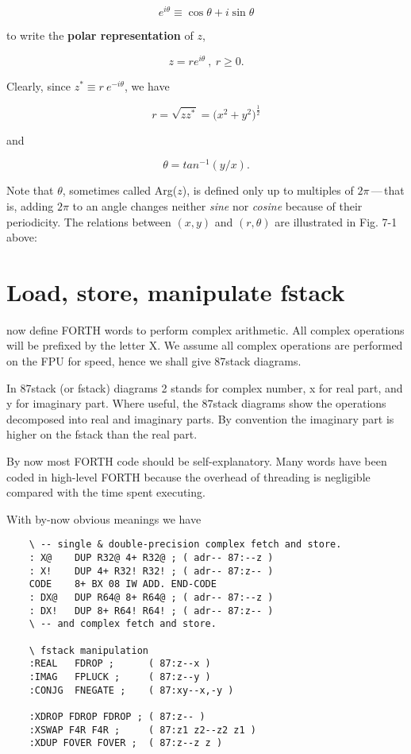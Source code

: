 \begin{equation}
  e^{i\theta} \equiv \cos \theta + i \sin \theta
\end{equation}

to write the \textbf{polar representation} of $z$,

\begin{equation}
  z = re^{i\theta}\ ,\ r \geq 0.
\end{equation}

Clearly, since $z^* \equiv r\ e^{-i\theta}$, we have

\begin{equation}
  r = \sqrt{zz^*} = \big(x^2 + y^2\big)^\frac{1}{2}
\end{equation}

and

\begin{equation}
  \theta = tan^{-1}(y/x).
\end{equation}

Note that $\theta$, sometimes called Arg($z$), is defined only up to multiples of $2\pi$\,---\,that is, adding $2\pi$ to an angle changes neither \textit{sine} nor \textit{cosine} because of their periodicity. The relations between $(x,y)$ and $(r,\theta)$ are illustrated in Fig. 7-1 above:

\section{Load, store, manipulate fstack}
 now define FORTH words to perform complex arithmetic. All complex operations will be prefixed by the letter X. We assume all complex operations are performed on the FPU for speed, hence we shall give 87stack diagrams.

In 87stack (or fstack) diagrams 2 stands for complex number, x for real part, and y for imaginary part. Where useful, the 87stack diagrams show the operations decomposed into real and imaginary parts. By convention the imaginary part is higher on the fstack than the real part.

By now most FORTH code should be self-explanatory. Many words have been coded in high-level FORTH because the overhead of threading is negligible compared with the time spent executing.

With by-now obvious meanings we have

\begin{lstlisting}
    \ -- single & double-precision complex fetch and store.
    : X@    DUP R32@ 4+ R32@ ; ( adr-- 87:--z )
    : X!    DUP 4+ R32! R32! ; ( adr-- 87:z-- )
    CODE    8+ BX 08 IW ADD. END-CODE
    : DX@   DUP R64@ 8+ R64@ ; ( adr-- 87:--z )
    : DX!   DUP 8+ R64! R64! ; ( adr-- 87:z-- )
    \ -- and complex fetch and store.

    \ fstack manipulation
    :REAL   FDROP ;      ( 87:z--x )
    :IMAG   FPLUCK ;     ( 87:z--y )
    :CONJG  FNEGATE ;    ( 87:xy--x,-y )

    :XDROP FDROP FDROP ; ( 87:z-- )
    :XSWAP F4R F4R ;     ( 87:z1 z2--z2 z1 )
    :XDUP FOVER FOVER ;  ( 87:z--z z )
\end{lstlisting}

